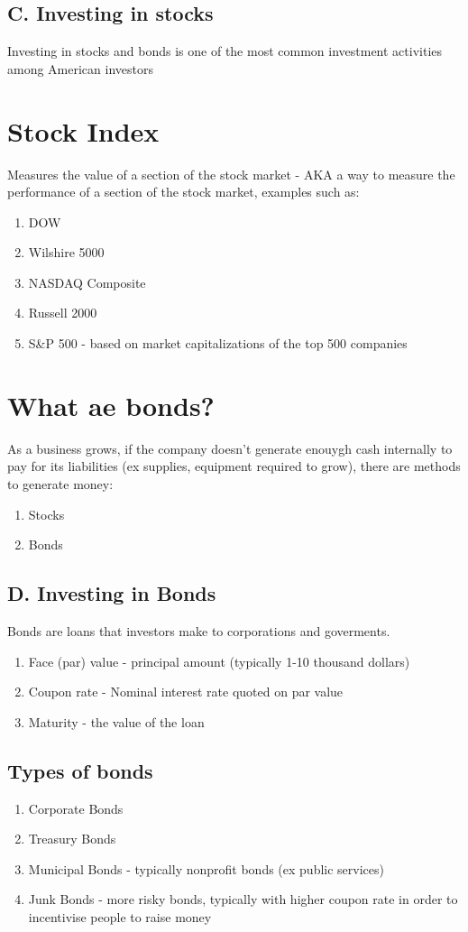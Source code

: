 \documentclass{report} %
\begin{document}
\subsection*{C. Investing in stocks}
Investing in stocks and bonds is one of the most common investment activities among American investors

\section*{Stock Index}
Measures the value of a section of the stock market - AKA a way to measure the performance of a section of the stock market, examples such as:
\begin{enumerate}
    \item DOW
    \item Wilshire 5000
    \item NASDAQ Composite
    \item Russell 2000
    \item S\&P 500 - based on market capitalizations of the top 500 companies
\end{enumerate}

\section*{What ae bonds?}
As a business grows, if the company doesn't generate enouygh cash internally to pay for its liabilities (ex supplies, equipment required to grow), there are methods to generate money:
\begin{enumerate}
    \item Stocks
    \item Bonds
\end{enumerate}

\subsection*{D. Investing in Bonds}
Bonds are loans that investors make to corporations and goverments.
\begin{enumerate}
    \item Face (par) value - principal amount (typically 1-10 thousand dollars)
    \item Coupon rate - Nominal interest rate quoted on par value
    \item Maturity - the value of the loan
\end{enumerate}

\subsection*{Types of bonds}
\begin{enumerate}
    \item Corporate Bonds
    \item Treasury Bonds
    \item Municipal Bonds - typically nonprofit bonds (ex public services)
    \item Junk Bonds - more risky bonds, typically with higher coupon rate in order to incentivise people to raise money
\end{enumerate}
\end{document}
